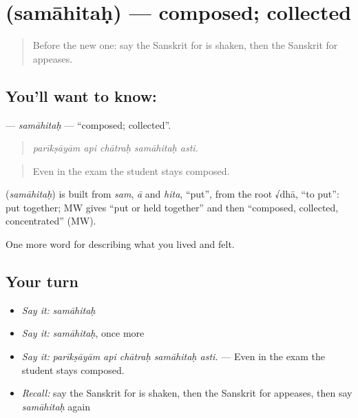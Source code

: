\section[\texorpdfstring{\sk{समाहितः} (samāhitaḥ)}{समाहितः (samāhitaḥ)}]{ (samāhitaḥ) — composed; collected}

\label{lesson:SA-C456-samahitah}



\begin{quote}
Before the new one: say the Sanskrit for is shaken, then the Sanskrit for appeases.
\end{quote}

\subsection*{You'll want to know: }
\textbf{} — \emph{samāhitaḥ} — \textquotedblleft{}composed; collected\textquotedblright{}.

\begin{quote}
    
\end{quote}

\begin{quote}
\emph{parīkṣāyām api chātraḥ samāhitaḥ asti.}
\end{quote}

\begin{quote}
Even in the exam the student stays composed.
\end{quote}

\begin{cousinweb}
\textbf{} (\emph{samāhitaḥ}) is built from \emph{sam}, \emph{ā} and \emph{hita}, \textquotedblleft{}put\textquotedblright{}, from the root √dhā, \textquotedblleft{}to put\textquotedblright{}: put together; MW gives \textquotedblleft{}put or held together\textquotedblright{} and then \textquotedblleft{}composed, collected, concentrated\textquotedblright{} (MW).
\end{cousinweb}

\begin{grammarlens}[title={What you've built}]
One more word for describing what you lived and felt.
\end{grammarlens}

\subsection*{Your turn}
\begin{itemize}
\raggedright
  \item \emph{Say it:} \emph{samāhitaḥ}
  \item \emph{Say it:} \emph{samāhitaḥ}, once more
  \item \emph{Say it:} \emph{parīkṣāyām api chātraḥ samāhitaḥ asti.} — Even in the exam the student stays composed.
  \item \emph{Recall:} say the Sanskrit for is shaken, then the Sanskrit for appeases, then say \emph{samāhitaḥ} again
\end{itemize}

